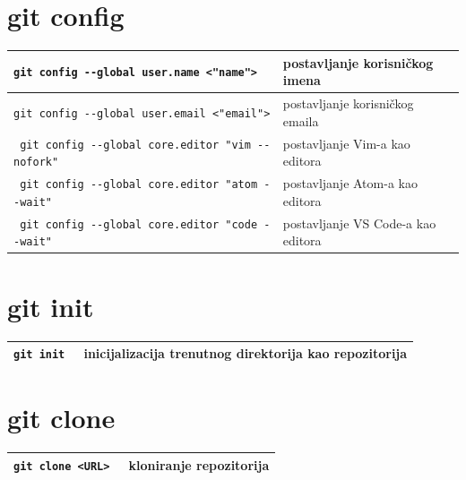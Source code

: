 \documentclass[10pt]{article}
\begin{document}
\renewcommand{\arraystretch}{1.50}

    \section*{\color{BrickRed} git config}
    \begin{tabular}{|>{\tt}p{9.25cm}|>{}p{15.50cm}|}
        \hline
        git config -{}-global user.name <"name">                & postavljanje korisničkog imena \\ \hline
        git config -{}-global user.email <"email">              & postavljanje korisničkog emaila \\ \hline
        git config -{}-global core.editor "vim -{}-nofork"      & postavljanje Vim-a kao editora \\ \hline 
        git config -{}-global core.editor "atom -{}-wait"       & postavljanje Atom-a kao editora \\ \hline
        git config -{}-global core.editor "code -{}-wait"       & postavljanje VS Code-a kao editora \\ \hline
    \end{tabular}

    \section*{\color{BrickRed} git init}
    \begin{tabular}{|>{\tt}p{9.25cm}|>{}p{15.50cm}|}
        \hline
        git init                                                & inicijalizacija trenutnog direktorija kao repozitorija \\ \hline
    \end{tabular}

    \section*{\color{BrickRed} git clone}
    \begin{tabular}{|>{\tt}p{9.25cm}|>{}p{15.50cm}|}
        \hline
        git clone <URL>                                         & kloniranje repozitorija \\ \hline
    \end{tabular}
\end{document}
